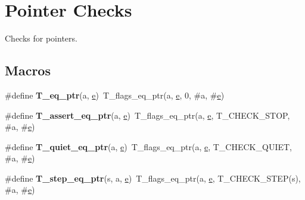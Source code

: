 \hypertarget{group__RTEMSTestFrameworkChecksPointer}{}\section{Pointer Checks}
\label{group__RTEMSTestFrameworkChecksPointer}


Checks for pointers.  


\subsection*{Macros}
\begin{DoxyCompactItemize}
\item 
\mbox{\label{group__RTEMSTestFrameworkChecksPointer_gaf030aed47663fc3dc287a2fc609db208}} 
\#define {\bfseries T\+\_\+eq\+\_\+ptr}(a,  \mbox{\hyperlink{sun4u_2tte_8h_a8b0b9ed08e0e18920ec2682f48228c27}{e}})~T\+\_\+flags\+\_\+eq\+\_\+ptr(a, \mbox{\hyperlink{sun4u_2tte_8h_a8b0b9ed08e0e18920ec2682f48228c27}{e}}, 0, \#a, \#\mbox{\hyperlink{sun4u_2tte_8h_a8b0b9ed08e0e18920ec2682f48228c27}{e}})
\item 
\mbox{\label{group__RTEMSTestFrameworkChecksPointer_ga245dcd60aca7c1be4b4e62efdaad14ff}} 
\#define {\bfseries T\+\_\+assert\+\_\+eq\+\_\+ptr}(a,  \mbox{\hyperlink{sun4u_2tte_8h_a8b0b9ed08e0e18920ec2682f48228c27}{e}})~T\+\_\+flags\+\_\+eq\+\_\+ptr(a, \mbox{\hyperlink{sun4u_2tte_8h_a8b0b9ed08e0e18920ec2682f48228c27}{e}}, T\+\_\+\+C\+H\+E\+C\+K\+\_\+\+S\+T\+OP, \#a, \#\mbox{\hyperlink{sun4u_2tte_8h_a8b0b9ed08e0e18920ec2682f48228c27}{e}})
\item 
\mbox{\label{group__RTEMSTestFrameworkChecksPointer_gadbe2c30b19850daa0be347e15f5ef5e0}} 
\#define {\bfseries T\+\_\+quiet\+\_\+eq\+\_\+ptr}(a,  \mbox{\hyperlink{sun4u_2tte_8h_a8b0b9ed08e0e18920ec2682f48228c27}{e}})~T\+\_\+flags\+\_\+eq\+\_\+ptr(a, \mbox{\hyperlink{sun4u_2tte_8h_a8b0b9ed08e0e18920ec2682f48228c27}{e}}, T\+\_\+\+C\+H\+E\+C\+K\+\_\+\+Q\+U\+I\+ET, \#a, \#\mbox{\hyperlink{sun4u_2tte_8h_a8b0b9ed08e0e18920ec2682f48228c27}{e}})
\item 
\mbox{\label{group__RTEMSTestFrameworkChecksPointer_gaa809c0c4f6fadc3bb69663d348412cd5}} 
\#define {\bfseries T\+\_\+step\+\_\+eq\+\_\+ptr}(s,  a,  \mbox{\hyperlink{sun4u_2tte_8h_a8b0b9ed08e0e18920ec2682f48228c27}{e}})~T\+\_\+flags\+\_\+eq\+\_\+ptr(a, \mbox{\hyperlink{sun4u_2tte_8h_a8b0b9ed08e0e18920ec2682f48228c27}{e}}, T\+\_\+\+C\+H\+E\+C\+K\+\_\+\+S\+T\+EP(s), \#a, \#\mbox{\hyperlink{sun4u_2tte_8h_a8b0b9ed08e0e18920ec2682f48228c27}{e}})

\end{DoxyCompactItemize}
